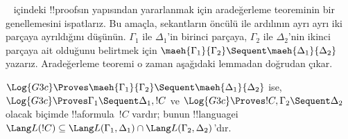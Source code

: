 ~ içindeki !!{proof}s{}ın yapısından yararlanmak için aradeğerleme
teoreminin bir genellemesini ispatlarız. Bu amaçla, sekantların öncülü ile
ardılının ayrı ayrı iki parçaya ayrıldığını düşünün. $\Gamma_1$ ile
$\Delta_1$'in birinci parçaya, $\Gamma_2$ ile $\Delta_2$'nin ikinci parçaya
ait olduğunu belirtmek için $\maeh{\Gamma_1}{\Gamma_2} \Sequent
\maeh{\Delta_1}{\Delta_2}$ yazarız. Aradeğerleme teoremi o zaman aşağıdaki
lemmadan doğrudan çıkar.

\begin{lem} $\Log{G3c}
\Proves \maeh{\Gamma_1}{\Gamma_2} \Sequent \maeh{\Delta_1}{\Delta_2}$
ise, $\Log{G3c} \Proves \Gamma_1 \Sequent \Delta_1, !C$ ve $\Log{G3c}
\Proves !C, \Gamma_2 \Sequent \Delta_2$ olacak biçimde !!a{formula}~$!C$
vardır; bunun !!{language}{}i $\Lang L(!C) \subseteq \Lang L(\Gamma_1,
\Delta_1) \cap \Lang L(\Gamma_2, \Delta_2)$'dır.
\end{lem}

